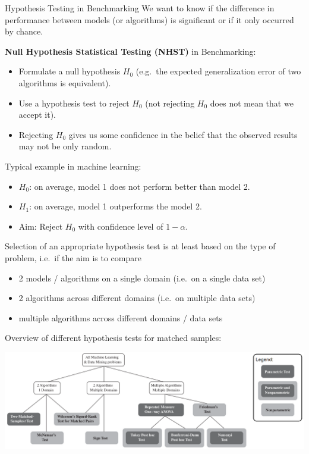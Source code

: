     \begin{frame}[c,allowframebreaks]{Hypothesis Testing in Benchmarking}
    We want to know if the difference in performance between models (or algorithms) is significant or if it only occurred by chance.

    \textbf{Null Hypothesis Statistical Testing (NHST)} in Benchmarking:

    \begin{itemize}
    \item Formulate a null hypothesis $H_0$ (e.g.\ the expected generalization error of two algorithms is equivalent).
    \item Use a hypothesis test to reject $H_0$ (not rejecting $H_0$ does not mean that we accept it).
    \item Rejecting $H_0$ gives us some confidence in the belief that the observed results may not be only random.
    \end{itemize}

    Typical example in machine learning:

    \begin{itemize}
    \item $H_0$: on average, model 1 does not perform better than model 2.
    \item $H_1$: on average, model 1 outperforms the model 2.
    \item Aim: Reject $H_0$ with confidence level of $1-\alpha$.
    \end{itemize}

    \framebreak

    Selection of an appropriate hypothesis test is at least based on the type of
    problem, i.e.\ if the aim is to compare
    \begin{itemize}
    \item 2 models / algorithms on a single domain (i.e.\ on a single data set)
    \item 2 algorithms across different domains (i.e.\ on multiple data sets)
    \item multiple algorithms across different domains / data sets
    \end{itemize}

    Overview of different hypothesis tests for matched samples:

    \begin{center}
    \includegraphics[height=.4\textheight]{tests_overview.png}
    \end{center}

    \end{frame}


